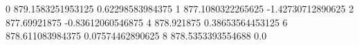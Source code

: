 0 879.1583251953125 0.62298583984375
1 877.1080322265625 -1.42730712890625
2 877.69921875 -0.83612060546875
4 878.921875 0.38653564453125
6 878.611083984375 0.07574462890625
8 878.5353393554688 0.0
